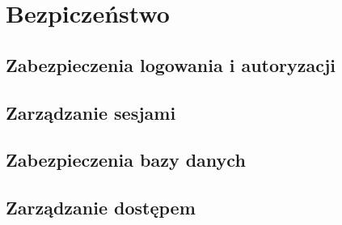 \documentclass[12pt,titlepage]{article}
\begin{document}
\section{Bezpiczeństwo}
\subsection{Zabezpieczenia logowania i autoryzacji}
\subsection{Zarządzanie sesjami}
\subsection{Zabezpieczenia bazy danych}
\subsection{Zarządzanie dostępem}

    
\end{document}
